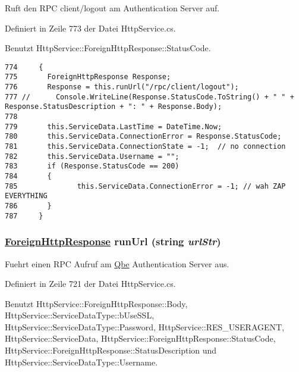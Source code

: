 Ruft den RPC client/logout am Authentication Server auf. 



Definiert in Zeile 773 der Datei Http\-Service.cs.

Benutzt Http\-Service::Foreign\-Http\-Response::Status\-Code.



\footnotesize\begin{verbatim}774     {
775       ForeignHttpResponse Response;
776       Response = this.runUrl("/rpc/client/logout");
777 //      Console.WriteLine(Response.StatusCode.ToString() + " " + Response.StatusDescription + ": " + Response.Body);
778 
779       this.ServiceData.LastTime = DateTime.Now;
780       this.ServiceData.ConnectionError = Response.StatusCode;
781       this.ServiceData.ConnectionState = -1;  // no connection
782       this.ServiceData.Username = "";
783       if (Response.StatusCode == 200) 
784       {
785              this.ServiceData.ConnectionError = -1; // wah ZAP EVERYTHING
786       }
787     }
\end{verbatim}\normalsize 
\hypertarget{classQbeSAS_1_1HttpService_QbeSAS_1_1HttpServiced9}{
\subsubsection[runUrl]{\setlength{\rightskip}{0pt plus 5cm}\hyperlink{classQbeSAS_1_1HttpService_1_1ForeignHttpResponse}{Foreign\-Http\-Response} run\-Url (string {\em url\-Str})}}
\label{classQbeSAS_1_1HttpService_QbeSAS_1_1HttpServiced9}


Fuehrt einen RPC Aufruf am \hyperlink{namespaceQbe}{Qbe} Authentication Server aus. 



Definiert in Zeile 721 der Datei Http\-Service.cs.

Benutzt Http\-Service::Foreign\-Http\-Response::Body, Http\-Service::Service\-Data\-Type::b\-Use\-SSL, Http\-Service::Service\-Data\-Type::Password, Http\-Service::RES\_\-USERAGENT, Http\-Service::Service\-Data, Http\-Service::Foreign\-Http\-Response::Status\-Code, Http\-Service::Foreign\-Http\-Response::Status\-Description und Http\-Service::Service\-Data\-Type::Username.



